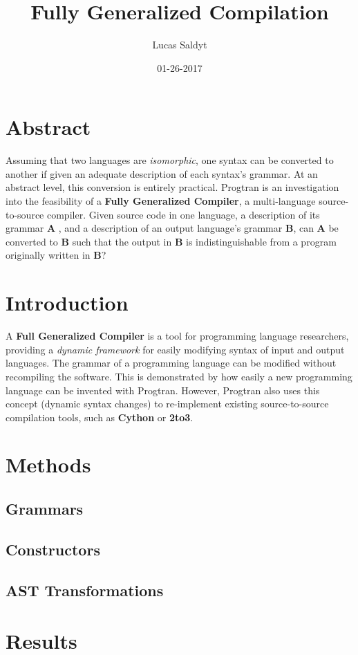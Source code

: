 \documentclass{article}
\title{Fully Generalized Compilation}
\date{01-26-2017}
\author{Lucas Saldyt}
\begin{document}
\maketitle
{}
\newpage
{}

\section{Abstract}

Assuming that two languages are \textit{isomorphic}, one syntax can be converted to another if given an adequate description of each syntax's grammar. At an abstract level, this conversion is entirely practical. Progtran is an investigation into the feasibility of a \textbf{Fully Generalized Compiler}, a multi-language source-to-source compiler. Given source code in one language, a description of its grammar \textbf{A} , and a description of an output language's grammar \textbf{B}, can \textbf{A} be converted to \textbf{B} such that the output in \textbf{B} is indistinguishable from a program originally written in \textbf{B}?

\section{Introduction}

A \textbf{Full Generalized Compiler} is a tool for programming language researchers, providing a \textit{dynamic framework} for easily modifying syntax of input and output languages. The grammar of a programming language can be modified without recompiling the software. This is demonstrated by how easily a new programming language can be invented with Progtran. However, Progtran also uses this concept (dynamic syntax changes) to re-implement existing source-to-source compilation tools, such as \textbf{Cython} or \textbf{2to3}.

\section{Methods}
\subsection{Grammars}
\subsection{Constructors}
\subsection{AST Transformations}


\section{Results}
\end{document}
